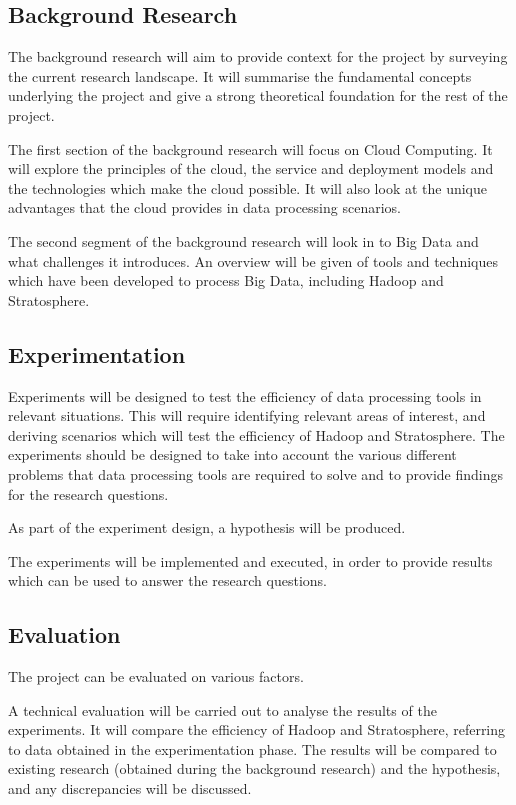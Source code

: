 \subsection{Background Research}
The background research will aim to provide context for the project by surveying the current research landscape. It will summarise the fundamental concepts underlying the project and give a strong theoretical foundation for the rest of the project.

The first section of the background research will focus on Cloud Computing. It will explore the principles of the cloud, the service and deployment models and the technologies which make the cloud possible. It will also look at the unique advantages that the cloud provides in data processing scenarios.

The second segment of the background research will look in to Big Data and what challenges it introduces. An overview will be given of tools and techniques which have been developed to process Big Data, including Hadoop and Stratosphere.

\subsection{Experimentation}
Experiments will be designed to test the efficiency of data processing tools in relevant situations. This will require identifying relevant areas of interest, and deriving scenarios which will test the efficiency of Hadoop and Stratosphere. The experiments should be designed to take into account the various different problems that data processing tools are required to solve and to provide findings for the research questions.

As part of the experiment design, a hypothesis will be produced.

The experiments will be implemented and executed, in order to provide results which can be used to answer the research questions.

\subsection{Evaluation}
The project can be evaluated on various factors.

A technical evaluation will be carried out to analyse the results of the experiments. It will compare the efficiency of Hadoop and Stratosphere, referring to data obtained in the experimentation phase. The results will be compared to existing research (obtained during the background research) and the hypothesis, and any discrepancies will be discussed. 

